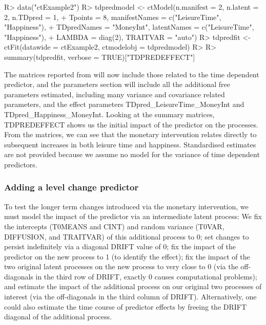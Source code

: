 \documentclass[nojss]{jss}\usepackage[]{graphicx}\usepackage[]{color}
\begin{document}
\begin{Schunk}
\begin{Sinput}
R> data("ctExample2")
R> tdpredmodel <- ctModel(n.manifest = 2, n.latent = 2, n.TDpred = 1, 
+   Tpoints = 8, manifestNames = c("LeisureTime", "Happiness"), 
+   TDpredNames = "MoneyInt", latentNames = c("LeisureTime", "Happiness"),
+   LAMBDA = diag(2), TRAITVAR = "auto")
R> tdpredfit <- ctFit(datawide = ctExample2, ctmodelobj = tdpredmodel)
R> 
R> summary(tdpredfit, verbose = TRUE)["TDPREDEFFECT"]
\end{Sinput}
\end{Schunk}


The matrices reported from  will now include those related to the time dependent predictor, and the parameters section will include all the additional free parameters estimated, including many variance and covariance related parameters, and the effect parameters TDpred\_LeisureTime\_MoneyInt and TDpred\_Happiness\_MoneyInt.  Looking at the summary matrices, TDPREDEFFECT shows us the initial impact of the predictor on the processes.  From the matrices, we can see that the monetary intervention relates directly to subsequent increases in both leisure time and happiness. Standardised estimates are not provided because we assume no model for the variance of time dependent predictors.

\subsubsection{Adding a level change predictor}\nopagebreak
To test the longer term changes introduced via the monetary intervention, we must model the impact of the predictor via an intermediate latent process: We fix the intercepts (T0MEANS and CINT) and random variance (T0VAR, DIFFUSION, and TRAITVAR) of this additional process to 0; set changes to persist indefinitely via a diagonal DRIFT value of 0; fix the impact of the predictor on the new process to 1 (to identify the effect); fix the impact of the two original latent processes on the new process to very close to 0 (via the off-diagonals in the third row of DRIFT, exactly 0 causes computational problems); and estimate the impact of the additional process on our original two processes of interest (via the off-diagonals in the third column of DRIFT). Alternatively, one could also estimate the time course of predictor effects by freeing the DRIFT diagonal of the additional process. 
\end{document}
